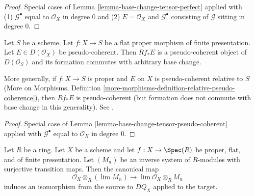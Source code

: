 \begin{proof}
Special cases of
Lemma \ref{lemma-base-change-tensor-perfect} applied with
(1) $\mathcal{G}^\bullet$ equal to $\mathcal{O}_X$ in degree $0$
and (2) $E = \mathcal{O}_X$ and $\mathcal{G}^\bullet$ consisting
of $\mathcal{G}$ sitting in degree $0$.
\end{proof}

\begin{lemma}
\label{lemma-flat-proper-pseudo-coherent-direct-image-general}
Let $S$ be a scheme. Let $f : X \to S$ be a flat proper
morphism of finite presentation. Let $E \in D(\mathcal{O}_X)$
be pseudo-coherent. Then $Rf_*E$ is a pseudo-coherent object of
$D(\mathcal{O}_S)$ and its formation commutes with arbitrary base change.
\end{lemma}

\noindent
More generally, if $f : X \to S$ is proper and $E$ on $X$ is pseudo-coherent
relative to $S$ (More on Morphisms, Definition
\ref{more-morphisms-definition-relative-pseudo-coherence}),
then $Rf_*E$ is pseudo-coherent
(but formation does not commute with base change in this generality).
See \cite{Kiehl}.

\begin{proof}
Special case of
Lemma \ref{lemma-base-change-tensor-pseudo-coherent} applied with
$\mathcal{G}^\bullet$ equal to $\mathcal{O}_X$ in degree $0$.
\end{proof}

\begin{lemma}
\label{lemma-pullback-and-limits}
Let $R$ be a ring. Let $X$ be a scheme and let
$f : X \to \Spec(R)$ be proper, flat, and
of finite presentation. Let $(M_n)$ be an inverse
system of $R$-modules with surjective transition maps.
Then the canonical map
$$
\mathcal{O}_X \otimes_R (\lim M_n)
\longrightarrow
\lim \mathcal{O}_X \otimes_R M_n
$$
induces an isomorphism from the source to $DQ_X$ applied to the target.
\end{lemma}

